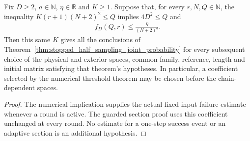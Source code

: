 \begin{theorem}
    \label{thm:stopped_half_sampling_fixed_threshold}
    \leanok
    Fix $D\ge2$, $a\in\mathbb N$, $\eta\in\mathbb R$ and $K\ge1$.
    Suppose that, for every $r,N,Q\in\mathbb N$, the inequality
    $K(r+1)(N+2)^2\le Q$ implies $4D^2\le Q$ and
    \begin{align}
        f_D(Q,r)\le\frac{\eta}{(N+2)^a}.
    \end{align}
    Then this same $K$ gives all the conclusions of
    Theorem~\ref{thm:stopped_half_sampling_joint_probability} for every
    subsequent choice of the physical and exterior spaces, common family,
    reference, length and initial matrix satisfying that theorem's
    hypotheses. In particular, a coefficient selected by the numerical
    threshold theorem may be chosen before the chain-dependent spaces.
\end{theorem}
\begin{proof}\leanok
    The numerical implication supplies the actual fixed-input failure
    estimate whenever a round is active. The guarded section proof uses
    this coefficient unchanged at every round. No estimate for a
    one-step success event or an adaptive section is an additional
    hypothesis.
\end{proof}

